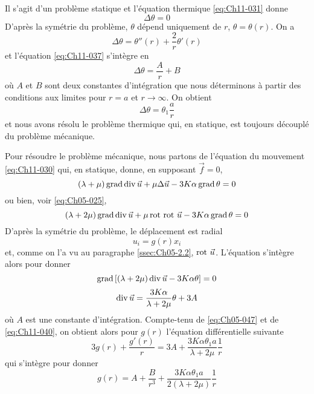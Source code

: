 Il s'agit d'un problème statique et l'équation thermique \eqref{eq:Ch11-031} donne 
\begin{equation}
    \Delta \theta = 0
    \label{eq:Ch11-037}
\end{equation}
D'après la symétrie du problème, $\theta$ dépend uniquement de $r$, $\theta=\theta(r)$.
On a 
\begin{equation}
    \Delta \theta = \theta''(r) +\frac{2}{r}\theta'(r)
    \label{eq:Ch11-038}
\end{equation}
et l'équation \eqref{eq:Ch11-037} s'intègre en 
\begin{equation}
    \Delta \theta = \frac{A}{r} + B
    \label{eq:Ch11-039}
\end{equation}
où $A$ et $B$ sont deux constantes d'intégration que nous déterminons à partir des conditions aux limites pour $r= a$ et $r \rightarrow \infty$.
On obtient 
\begin{equation}
    \Delta \theta = \theta_1\frac{a}{r}
    \label{eq:Ch11-040}
\end{equation}
et nous avons résolu le problème thermique qui, en statique, est toujours découplé du problème mécanique. 

Pour résoudre le problème mécanique, nous partons de l'équation du mouvement \eqref{eq:Ch11-030} qui, en statique, donne, en supposant $\vec{f}=0$, 
\begin{equation}
    (\lambda+\mu) \operatorname*{\mathrm{grad}} \operatorname*{\mathrm{div}} \vec{u} + \mu \Delta \vec{u} - 3K\alpha \operatorname*{\mathrm{grad}} \theta = 0
\end{equation}
ou bien, voir \eqref{eq:Ch05-025}, 
\begin{equation}
    (\lambda+2\mu) \operatorname*{\mathrm{grad}} \operatorname*{\mathrm{div}} \vec{u} + \mu \operatorname*{\mathrm{rot}\,} \operatorname*{\mathrm{rot}\,} \vec{u} - 3K\alpha \operatorname*{\mathrm{grad}} \theta = 0
    \label{eq:Ch11-041}
\end{equation}
D'après la symétrie du problème, le déplacement est radial 
\begin{equation}
    u_i=g(r) x_i
    \label{eq:Ch11-042}
\end{equation}
et, comme on l'a vu au paragraphe \ref{ssec:Ch05-2.2}, $\operatorname*{\mathrm{rot}\,} \vec{u}$. L'équation s'intègre alors pour donner 
\begin{equation} 
\operatorname*{\mathrm{grad}}\left[(\lambda + 2 \mu) \operatorname*{\mathrm{div}} \vec{u} - 3 K \alpha \theta \right] = 0
\end{equation}
\begin{equation}
    \operatorname*{\mathrm{div}} \vec{u} = \frac{3K\alpha}{\lambda + 2 \mu} \theta + 3 A
    \label{eq:Ch11-043}
\end{equation}
où $A$ est une constante d'intégration.
Compte-tenu de \eqref{eq:Ch05-047} et de \eqref{eq:Ch11-040}, on obtient alors pour $g(r)$ l'équation différentielle suivante 
\begin{equation}
    3g(r)+\frac{g'(r)}{r} = 3A + \frac{3K\alpha\theta_1 a}{\lambda + 2 \mu}\frac{1}{r}
    \label{eq:Ch11-044}
\end{equation}
qui s'intègre pour donner 
\begin{equation}
    g(r) = A + \frac{B}{r^3}+\frac{3K\alpha\theta_1 a}{2(\lambda + 2\mu)}\frac{1}{r}
    \label{eq:Ch11-045}
\end{equation}

